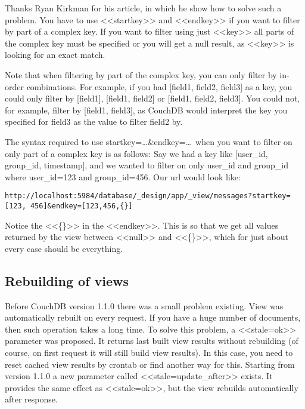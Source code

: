 Thanks Ryan Kirkman for his article\cite{couchdb_filtering_views}, in which he show how to solve such a problem. You have to use <<startkey>> and <<endkey>> if you want to filter by part of a complex key. If you want to filter using just <<key>> all parts of the complex key must be specified or you will get a null result, as <<key>> is looking for an exact match.

Note that when filtering by part of the complex key, you can only filter by in-order combinations. For example, if you had [field1, field2, field3] as a key, you could only filter by [field1], [field1, field2] or [field1, field2, field3]. You could not, for example, filter by [field1, field3], as CouchDB would interpret the key you specified for field3 as the value to filter field2 by.

The syntax required to use startkey=\dots\&endkey=\dots~when you want to filter on only part of a complex key is as follows:
Say we had a key like [user\_id, group\_id, timestamp], and we wanted to filter on only user\_id and group\_id where user\_id=123 and group\_id=456. Our url would look like:

\begin{lstlisting}[label=lst:couchdb1,caption=Filtering Views by Parts of a Complex Key]
http://localhost:5984/database/_design/app/_view/messages?startkey=[123, 456]&endkey=[123,456,{}]
\end{lstlisting}

Notice the <<\{\}>> in the <<endkey>>. This is so that we get all values returned by the view between <<null>> and <<\{\}>>, which for just about every case should be everything.

\subsection{Rebuilding of views}

Before CouchDB version 1.1.0 there was a small problem existing. View was automatically rebuilt on every request. If you have a huge number of documents, then such operation takes a long time. To solve this problem, a <<stale=ok>> parameter was proposed. It returns last built view results without rebuilding (of course, on first request it will still build view results). In this case, you need to reset cached view results by crontab or find another way for this. Starting from version 1.1.0 a new parameter called <<stale=update\_after>> exists. It provides the same effect as <<stale=ok>>, but the view rebuilds automatically after response.


